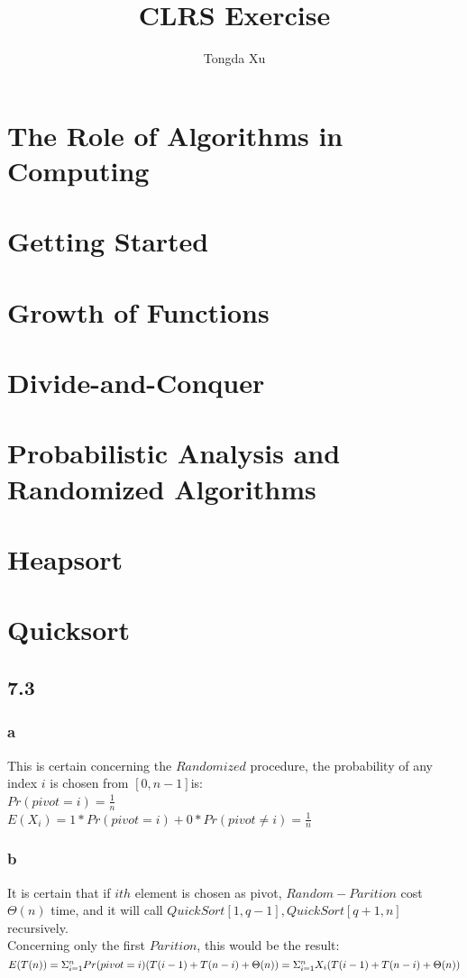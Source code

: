 \documentclass[]{article}
\title{CLRS Exercise}
\author{Tongda Xu}
\begin{document}
\maketitle
\section{The Role of Algorithms in Computing}
\section{Getting Started}
\section{Growth of Functions}
\section{Divide-and-Conquer}
\section{Probabilistic Analysis and Randomized Algorithms}
\section{Heapsort}
\section{Quicksort}
\subsection{7.3}
\subsubsection{a}
This is certain concerning the $Randomized$ procedure, the probability of any index $i$ is chosen from $[0,n-1]$is:\\
$Pr(pivot = i) = \frac{1}{n}$\\
$E(X_{i}) = 1*Pr(pivot = i) + 0*Pr(pivot \neq i) = \frac{1}{n}$

\subsubsection{b}
It is certain that if $ith$ element is chosen as pivot, $Random-Parition$ cost $\Theta(n)$ time, and it will call $QuickSort[1, q-1], QuickSort[q+1, n]$ recursively.\\
Concerning only the first $Parition$, this would be the result:\\
$E(T(n)) = \Sigma_{i=1}^{n}Pr(pivot = i)(T(i-1) + T(n-i) + \Theta(n))\\
 = \Sigma_{i=1}^{n}X_{i}(T(i-1) + T(n-i) + \Theta(n))$
 
\end{document}
